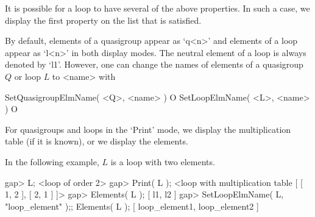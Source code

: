 It is possible for a loop to have several of the above properties. In such a
case, we display the first property on the list that is satisfied.

By default, elements of a quasigroup appear as `q<n>' and elements of a loop
appear as `l<n>' in both display modes. The neutral element of a loop is always
denoted by `l1'. However, one can change the names of elements of a quasigroup
$Q$ or loop $L$ to <name> with

\>SetQuasigroupElmName( <Q>, <name> ) O
\>SetLoopElmName( <L>, <name> ) O

For quasigroups and loops in the `Print' mode, we display the multiplication
table (if it is known), or we display the elements.

In the following example, $L$ is a loop with two elements.

\beginexample
gap> L;
<loop of order 2>
gap> Print( L );
<loop with multiplication table [ [ 1,  2 ], [  2,  1 ] ]>
gap> Elements( L );
[ l1, l2 ]
gap> SetLoopElmName( L, "loop_element" );; Elements( L );
[ loop_element1, loop_element2 ]
\endexample
